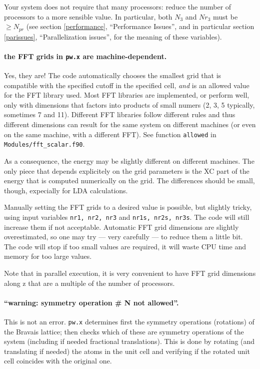 \documentclass[12pt,a4paper]{article}
\begin{document}
Your system does not require that many processors: reduce the number
of processors to a more sensible value.
In particular, both $N_3$ and $Nr_3$ must be $\geq N_{pr}$ (see
section \ref{performance}, ``Performance Issues'', and in particular
section \ref{parissues}, ``Parallelization issues'', for the meaning
of these variables).

\paragraph{the FFT grids in \texttt{pw.x} are machine-dependent.}

Yes, they are!
The code automatically chooses the smallest grid that is compatible
with the specified cutoff in the specified cell, \emph{and} is an
allowed value for the FFT library used.
Most FFT libraries are implemented, or perform well, only with
dimensions that factors into products of small numers (2, 3, 5
typically, sometimes 7 and 11).
Different FFT libraries follow different rules and thus different
dimensions can result for the same system on different machines (or
even on the same machine, with a different FFT).
See function \texttt{allowed} in \texttt{Modules/fft\_scalar.f90}.

As a consequence, the energy may be slightly different on different
machines.
The only piece that depends explicitely on the grid parameters is the
XC part of the energy that is computed numerically on the grid.
The differences should be small, though, expecially for LDA
calculations.

Manually setting the FFT grids to a desired value is possible, but
slightly tricky, using input variables \texttt{nr1, nr2, nr3} and
\texttt{nr1s, nr2s, nr3s}.
The code will still increase them if not acceptable.
Automatic FFT grid dimensions are slightly overestimated, so one may
try --- very carefully --- to reduce them a little bit.
The code will stop if too small values are required, it will waste CPU
time and memory for too large values.

Note that in parallel execution, it is very convenient to have FFT
grid dimensions along z that are a multiple of the number of
processors.

\paragraph{``warning: symmetry operation \# N not allowed''.}

This is not an error.
\texttt{pw.x} determines first the symmetry operations (rotations)
of the Bravais lattice; then checks which of these are symmetry
operations of the system (including if needed fractional
translations).
This is done by rotating (and translating if needed) the atoms in
the unit cell and verifying if the rotated unit cell coincides
with the original one. 
\end{document}
